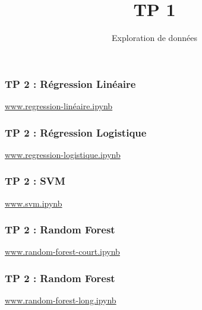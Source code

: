 \documentclass{formation}
\title{TP 1}
\subtitle{Exploration de données}
\begin{document}
\maketitle

\begin{frame}
  \frametitle{TP 2 : Régression Linéaire}
  \begin{center}
    \href{https://drive.google.com/open?id=1CAkh09NmO-smYF9h3C5AA_69CZ9d7sTq}{www.regression-linéaire.ipynb}
  \end{center}
\end{frame}

\begin{frame}
  \frametitle{TP 2 : Régression Logistique}
  \begin{center}
    \href{https://drive.google.com/open?id=1n0fw_WMFTHjK0NwwVOzUnV31keNx6Sng}{www.regression-logistique.ipynb}
  \end{center}
\end{frame}

\begin{frame}
  \frametitle{TP 2 : SVM}
  \begin{center}
    \href{https://drive.google.com/open?id=1qbf95qZj0rW0cSzfIXUDHGwe0KrTOe8f}{www.svm.ipynb}
  \end{center}
\end{frame}

\begin{frame}
  \frametitle{TP 2 : Random Forest}
  \begin{center}
    \href{https://drive.google.com/open?id=1zVDe4ZdTZngGHFtI1c7Ky52WTJDWLTv2}{www.random-forest-court.ipynb}
  \end{center}
\end{frame}

\begin{frame}
  \frametitle{TP 2 : Random Forest}
  \begin{center}
    \href{https://drive.google.com/open?id=1ooL-E238TCsFQURfnKGY9uqjyXqRqySl}{www.random-forest-long.ipynb}
  \end{center}
\end{frame}
\end{document}
